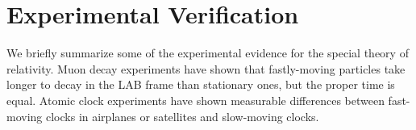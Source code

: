 

\section{Experimental Verification}
We briefly summarize some of the experimental evidence for the special theory of relativity. 
Muon decay experiments have shown that fastly-moving particles take longer to decay in the LAB frame than stationary ones, but the proper time is equal. 
Atomic clock experiments have shown measurable differences between fast-moving clocks in airplanes or satellites and slow-moving clocks. 
